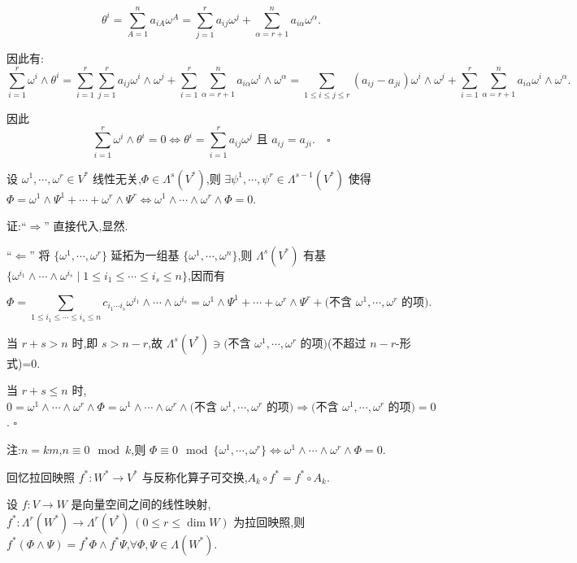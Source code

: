 \[
\theta^i = \sum_{A=1}^n a_{iA} \omega^A = \sum_{j=1}^r a_{ij} \omega^j + \sum_{\alpha=r+1}^n a_{i\alpha} \omega^\alpha.
\]

因此有:
\[
\sum_{i=1}^r \omega^i \wedge \theta^i = \sum_{i=1}^r \sum_{j=1}^r a_{ij} \omega^i \wedge \omega^j + \sum_{i=1}^r \sum_{\alpha=r+1}^n a_{i\alpha} \omega^i \wedge \omega^\alpha = \sum_{1 \leq i \leq j \leq r} (a_{ij} - a_{ji}) \omega^i \wedge \omega^j + \sum_{i=1}^r \sum_{\alpha=r+1}^n a_{i\alpha} \omega^i \wedge \omega^\alpha.
\]

因此
\[
\sum_{i=1}^r \omega^i \wedge \theta^i = 0 \iff \theta^i = \sum_{i=1}^r a_{ij} \omega^j \text{ 且 } a_{ij} = a_{ji}. \quad \square
\]

\begin{theorem}
设 $\omega^1, \cdots, \omega^r \in V^*$ 线性无关,$\Phi \in \Lambda^s(V^*)$,则 $\exists \psi^1, \cdots, \psi^r \in \Lambda^{s-1}(V^*)$ 使得 $\Phi = \omega^1 \wedge \Psi^1 + \cdots + \omega^r \wedge \Psi^r \iff \omega^1 \wedge \cdots \wedge \omega^r \wedge \Phi = 0$.
\end{theorem}

证:“$\Rightarrow$” 直接代入,显然.

“$\Leftarrow$” 将 $\{\omega^1, \cdots, \omega^r\}$ 延拓为一组基 $\{\omega^1, \cdots, \omega^n\}$,则 $\Lambda^s(V^*)$ 有基 $\{\omega^{i_1} \wedge \cdots \wedge \omega^{i_s} \mid 1 \leq i_1 \leq \cdots \leq i_s \leq n\}$,因而有

\[
\Phi = \sum_{1 \leq i_1 \leq \cdots \leq i_s \leq n} c_{i_1 \cdots i_s} \omega^{i_1} \wedge \cdots \wedge \omega^{i_s} = \omega^1 \wedge \Psi^1 + \cdots + \omega^r \wedge \Psi^r + \text{(不含 } \omega^1, \cdots, \omega^r \text{ 的项)}.
\]

当 $r + s > n$ 时,即 $s > n - r$,故 $\Lambda^s(V^*) \ni \text{(不含 } \omega^1, \cdots, \omega^r \text{ 的项)}$(不超过 $n - r$-形式)=0.

当 $r + s \leq n$ 时,$0 = \omega^1 \wedge \cdots \wedge \omega^r \wedge \Phi = \omega^1 \wedge \cdots \wedge \omega^r \wedge \text{(不含 } \omega^1, \cdots, \omega^r \text{ 的项)} \Rightarrow \text{(不含 } \omega^1, \cdots, \omega^r \text{ 的项)} = 0$. $\square$

注:$n = km$,$n \equiv 0 \mod k$,则 $\Phi \equiv 0 \mod \{\omega^1, \cdots, \omega^r\} \iff \omega^1 \wedge \cdots \wedge \omega^r \wedge \Phi = 0$.

回忆拉回映照 $f^* : W^* \to V^*$ 与反称化算子可交换,$A_k \circ f^* = f^* \circ A_k$.

\begin{proposition}
设 $f : V \to W$ 是向量空间之间的线性映射,$f^* : \Lambda^r(W^*) \to \Lambda^r(V^*) \ (0 \leq r \leq \dim W)$ 为拉回映照,则 $f^*(\Phi \wedge \Psi) = f^* \Phi \wedge f^* \Psi$,$\forall \Phi, \Psi \in \Lambda(W^*)$.
\end{proposition}

